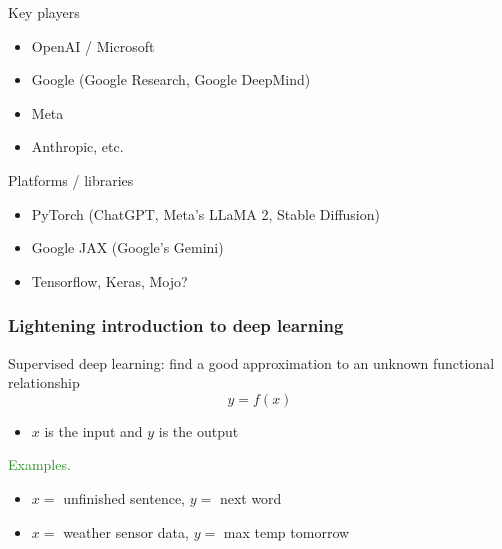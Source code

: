 \documentclass[
    xcolor={svgnames,dvipsnames},
    hyperref={colorlinks, citecolor=DeepPink4, linkcolor=DarkRed, urlcolor=DarkBlue}
    ]{beamer}  %
\newcommand{\Egs}{\textcolor{ForestGreen}{Examples. }}
\newcommand{\1}{\mathbbm 1}
\begin{document}
\begin{frame}
    
    Key players
    \begin{itemize}
        \item OpenAI / Microsoft 
        \vspace{0.5em}
        \item Google (Google Research, Google DeepMind)
        \vspace{0.5em}
        \item Meta
        \vspace{0.5em}
        \item Anthropic, etc.
    \end{itemize}

    Platforms / libraries

    \begin{itemize}
        \item PyTorch (ChatGPT, Meta's LLaMA 2,  Stable Diffusion)
        \vspace{0.5em}
        \item Google JAX (Google's Gemini)
        \vspace{0.5em}
        \item Tensorflow, Keras, Mojo?
    \end{itemize}

\end{frame}


\begin{frame}
    \frametitle{Lightening introduction to deep learning}
    
    Supervised deep learning: find a good approximation to an unknown functional
    relationship
    \begin{equation*}
        y = f(x)
    \end{equation*}

    \begin{itemize}
        \item $x$ is the input and $y$ is the output
    \end{itemize}

        \vspace{0.5em}
        \vspace{0.5em}
        \vspace{0.5em}
    \Egs
    \begin{itemize}
        \item $x = $ unfinished sentence, $y = $ next word
        \vspace{0.5em}
        \item $x = $ weather sensor data, $y = $ max temp tomorrow
    \end{itemize}

\end{frame}
\end{document}
